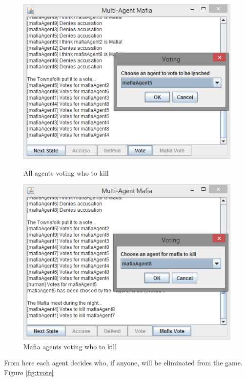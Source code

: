\documentclass[12pt]{article} %
\begin{document}
\begin{figure}[H]
\centering
\begin{minipage}{0.49\textwidth}
\centering
\includegraphics[width=\linewidth]{mafia-townvote}
\caption{All agents voting who to kill}
\label{fig:tvote}
\end{minipage}\hfill
\begin{minipage}{0.49\textwidth}
\centering
\includegraphics[width=\linewidth]{mafia-mafiavote}
\caption{Mafia agents voting who to kill}
\label{fig:mvote}
\end{minipage}
\end{figure}

From here each agent decides who, if anyone, will be eliminated from the game. Figure \ref{fig:tvote} 
\end{document}
